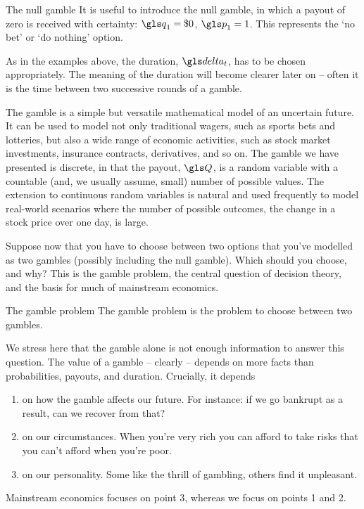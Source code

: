 \begin{example}{The null gamble}
It is useful to introduce the null gamble, in which a payout of zero is received 
with certainty: $\q_1=\$0$, $\p_1=1$. This represents the `no bet' or `do nothing' option.

As in the examples above, the duration, $\dt$, has to be chosen appropriately. 
The meaning of the duration will become clearer later on -- often it is the time 
between two successive rounds of a gamble.
\end{example}

The gamble is a simple but versatile mathematical model of an uncertain future. 
It can be used to model not only traditional wagers, such as sports bets and 
lotteries, but also a wide range of economic activities, such as stock market 
investments, insurance contracts, derivatives, and so on. The gamble we have 
presented is discrete, in that the payout, $\Q$, is a random variable with a 
countable (and, we usually assume, small) number of possible values. 
The extension to continuous random variables is natural and used frequently 
to model real-world scenarios where the number of possible outcomes, \eg the change 
in a stock price over one day, is large.

Suppose now that you have to choose between two options that you've modelled 
as two gambles (possibly including the null gamble). Which should you choose, 
and why? This is the gamble problem, the central question of decision theory, and 
the basis for much of mainstream economics.

\begin{defn}{The gamble problem}
The gamble problem is the problem to choose between two gambles.
\end{defn}

We stress here that the gamble alone is not enough information to answer this question. 
The value of a gamble -- clearly -- depends on more facts than probabilities, payouts, and duration. Crucially, it depends 
\begin{enumerate}
\item
on how the gamble affects our future. For instance: if we go bankrupt as a result, can we recover from that?
\item
on our circumstances. When you're very rich you can afford to take risks that you can't afford when you're poor. 
\item
on our personality. Some like the thrill of gambling, others find it unpleasant.
\end{enumerate}
Mainstream economics focuses on point 3, whereas we focus on points 1 and 2.

